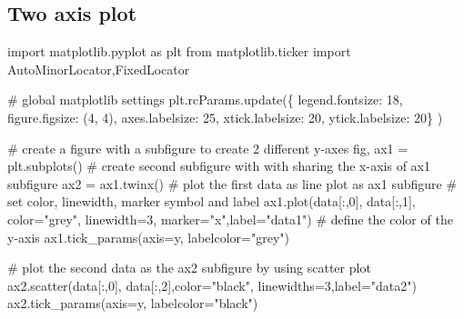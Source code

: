 \documentclass[
  letterpaper,
]{article}
\newenvironment{Shaded}{\begin{snugshade}}{\end{snugshade}}
\newcommand{\CommentTok}[1]{\textcolor[rgb]{0.37,0.37,0.37}{#1}}
\newcommand{\DecValTok}[1]{\textcolor[rgb]{0.68,0.00,0.00}{#1}}
\newcommand{\ImportTok}[1]{\textcolor[rgb]{0.00,0.46,0.62}{#1}}
\newcommand{\NormalTok}[1]{\textcolor[rgb]{0.00,0.23,0.31}{#1}}
\newcommand{\OperatorTok}[1]{\textcolor[rgb]{0.37,0.37,0.37}{#1}}
\newcommand{\StringTok}[1]{\textcolor[rgb]{0.13,0.47,0.30}{#1}}
\begin{document}
\hypertarget{two-axis-plot}{%
\subsection*{Two axis plot}\label{two-axis-plot}}


\begin{Shaded}
\begin{Highlighting}[]
\ImportTok{import}\NormalTok{ matplotlib.pyplot }\ImportTok{as}\NormalTok{ plt}
\ImportTok{from}\NormalTok{ matplotlib.ticker }\ImportTok{import}\NormalTok{ AutoMinorLocator,FixedLocator}


\CommentTok{\# global matplotlib settings}
\NormalTok{plt.rcParams.update(\{}
    \StringTok{\textquotesingle{}legend.fontsize\textquotesingle{}}\NormalTok{: }\DecValTok{18}\NormalTok{,}
    \StringTok{\textquotesingle{}figure.figsize\textquotesingle{}}\NormalTok{: (}\DecValTok{4}\NormalTok{, }\DecValTok{4}\NormalTok{),}
    \StringTok{\textquotesingle{}axes.labelsize\textquotesingle{}}\NormalTok{: }\DecValTok{25}\NormalTok{,}
    \StringTok{\textquotesingle{}xtick.labelsize\textquotesingle{}}\NormalTok{: }\DecValTok{20}\NormalTok{,}
    \StringTok{\textquotesingle{}ytick.labelsize\textquotesingle{}}\NormalTok{: }\DecValTok{20}\NormalTok{\}}
\NormalTok{)}

\CommentTok{\# create a figure with a subfigure to create 2 different y{-}axes}
\NormalTok{fig, ax1 }\OperatorTok{=}\NormalTok{ plt.subplots()}
\CommentTok{\# create second subfigure with with sharing the x{-}axis of ax1 subfigure}
\NormalTok{ax2 }\OperatorTok{=}\NormalTok{ ax1.twinx() }
\CommentTok{\# plot the first data as line plot as ax1 subfigure}
\CommentTok{\# set color, linewidth, marker symbol and label}
\NormalTok{ax1.plot(data[:,}\DecValTok{0}\NormalTok{], data[:,}\DecValTok{1}\NormalTok{], color}\OperatorTok{=}\StringTok{"grey"}\NormalTok{, linewidth}\OperatorTok{=}\DecValTok{3}\NormalTok{, marker}\OperatorTok{=}\StringTok{"x"}\NormalTok{,label}\OperatorTok{=}\StringTok{"data1"}\NormalTok{)}
\CommentTok{\# define the color of the y{-}axis}
\NormalTok{ax1.tick\_params(axis}\OperatorTok{=}\StringTok{\textquotesingle{}y\textquotesingle{}}\NormalTok{, labelcolor}\OperatorTok{=}\StringTok{"grey"}\NormalTok{)}

\CommentTok{\# plot the second data as the ax2 subfigure by using scatter plot}
\NormalTok{ax2.scatter(data[:,}\DecValTok{0}\NormalTok{], data[:,}\DecValTok{2}\NormalTok{],color}\OperatorTok{=}\StringTok{"black"}\NormalTok{, linewidths}\OperatorTok{=}\DecValTok{3}\NormalTok{,label}\OperatorTok{=}\StringTok{"data2"}\NormalTok{)}
\NormalTok{ax2.tick\_params(axis}\OperatorTok{=}\StringTok{\textquotesingle{}y\textquotesingle{}}\NormalTok{, labelcolor}\OperatorTok{=}\StringTok{"black"}\NormalTok{)}


\end{Highlighting}
\end{Shaded}
\end{document}
